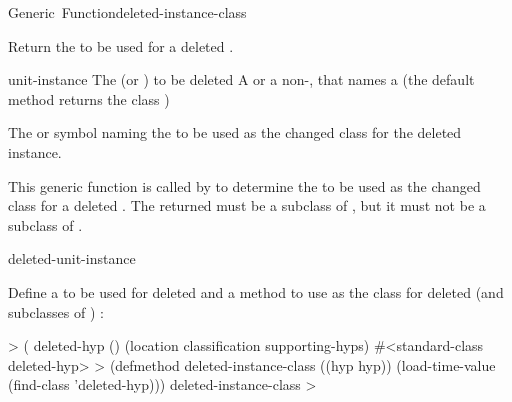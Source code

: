 \documentclass[10pt,twoside,english,pdftex]{article}
\begin{document}
\begin{functiondoc}{Generic~Function}{deleted-instance-class}%
  {
    }
%
%

\fnsyntax

\fnpurpose Return the  to be used for a deleted
.

\fnmethods
{}%
  {\code{(} 
    \returns{} }

\fnpackage {}

\fnmodule {}

\fnargs
\begin{args}{unit-instance}
 The  (or ) to
  be deleted
\arg[class] A  or a non-\nil,  that
names a  (the default method returns the class
)
\end{args}

\fnreturns The  or symbol naming the  to be used as
the changed class for the deleted instance.

\fndescription This generic function is called by
 to determine the  to be
used as the changed class for a deleted .  The returned
 must be a subclass of
, but it must not be a subclass
of .

\begin{alsos}{deleted-unit-instance}
\end{alsos}

\fnexample 
{}%
%
%
Define a  to be used for deleted 
 and a  method to
use  as the class for deleted  (and
subclasses of ) :
%
\W\supp
\begin{example}
  > ( deleted-hyp ()
      (location
       classification
       supporting-hyps)
  #<standard-class deleted-hyp>
  > (defmethod deleted-instance-class ((hyp hyp))
      (load-time-value (find-class 'deleted-hyp)))
  deleted-instance-class
  >
\end{example}

\end{functiondoc}
\end{document}
